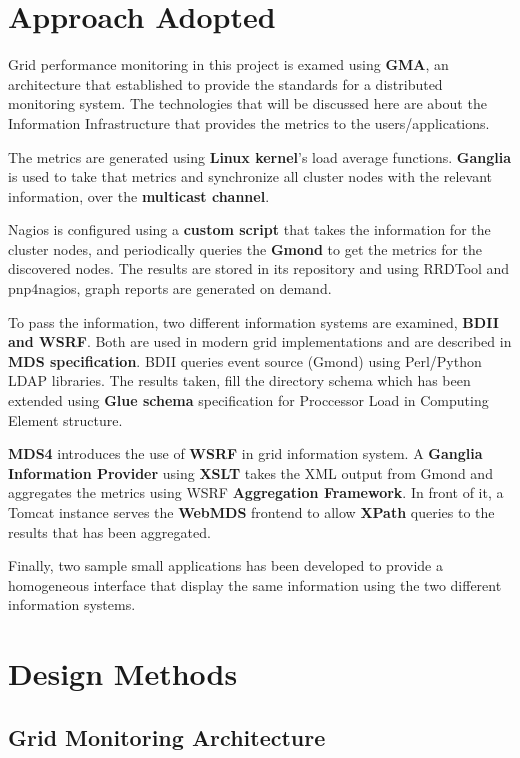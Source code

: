 \section{Approach Adopted}

Grid performance monitoring in this project is examed using {\bf GMA}, an architecture that established to provide the standards for a distributed monitoring system. The technologies that will be discussed here are about the Information Infrastructure that provides the metrics to the users/applications.

The metrics are generated using {\bf Linux kernel}'s load average functions. {\bf Ganglia} is used to take that metrics and synchronize all cluster nodes with the relevant information, over the {\bf multicast channel}.

Nagios is configured using a {\bf custom script} that takes the information for the cluster nodes, and periodically queries the {\bf Gmond} to get the metrics for the discovered nodes. The results are stored in its repository and using RRDTool and pnp4nagios, graph reports are generated on demand.

To pass the information, two different information systems are examined, {\bf BDII and WSRF}. Both are used in modern grid implementations and are described in {\bf MDS specification}. BDII queries event source (Gmond) using Perl/Python LDAP libraries. The results taken, fill the directory schema which has been extended using {\bf Glue schema} specification for Proccessor Load in Computing Element structure.

{\bf MDS4} introduces the use of {\bf WSRF} in grid information system. A {\bf Ganglia Information Provider} using {\bf XSLT} takes the XML output from Gmond and aggregates the metrics using WSRF {\bf Aggregation Framework}. In front of it, a Tomcat instance serves the {\bf WebMDS} frontend to allow {\bf XPath} queries to the results that has been aggregated.

Finally, two sample small applications has been developed to provide a homogeneous interface that display the same information using the two different information systems.

\section{Design Methods}

\subsection{Grid Monitoring Architecture}

